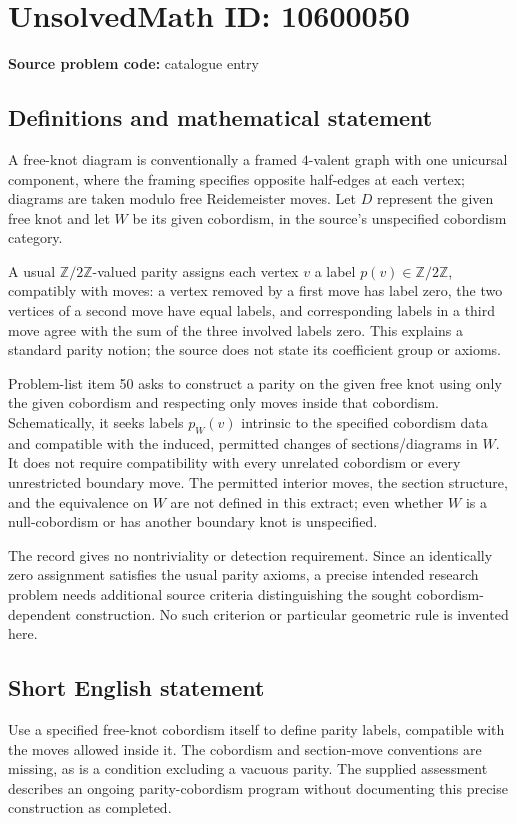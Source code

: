 \documentclass[11pt]{article}
\newcommand{\Z}{\mathbb{Z}}
\begin{document}
\section*{UnsolvedMath ID: 10600050}
\textbf{Source problem code:} catalogue entry
\subsection{Definitions and mathematical statement}
A free-knot diagram is conventionally a framed \(4\)-valent graph with one unicursal component, where the framing specifies opposite half-edges at each vertex; diagrams are taken modulo free Reidemeister moves. Let \(D\) represent the given free knot and let \(W\) be its given cobordism, in the source's unspecified cobordism category.

A usual \(\Z/2\Z\)-valued parity assigns each vertex \(v\) a label \(p(v)\in\Z/2\Z\), compatibly with moves: a vertex removed by a first move has label zero, the two vertices of a second move have equal labels, and corresponding labels in a third move agree with the sum of the three involved labels zero. This explains a standard parity notion; the source does not state its coefficient group or axioms.

Problem-list item 50 asks to construct a parity on the given free knot using only the given cobordism and respecting only moves inside that cobordism. Schematically, it seeks labels \(p_W(v)\) intrinsic to the specified cobordism data and compatible with the induced, permitted changes of sections/diagrams in \(W\). It does not require compatibility with every unrelated cobordism or every unrestricted boundary move. The permitted interior moves, the section structure, and the equivalence on \(W\) are not defined in this extract; even whether \(W\) is a null-cobordism or has another boundary knot is unspecified.

The record gives no nontriviality or detection requirement. Since an identically zero assignment satisfies the usual parity axioms, a precise intended research problem needs additional source criteria distinguishing the sought cobordism-dependent construction. No such criterion or particular geometric rule is invented here.
\subsection{Short English statement}
Use a specified free-knot cobordism itself to define parity labels, compatible with the moves allowed inside it. The cobordism and section-move conventions are missing, as is a condition excluding a vacuous parity. The supplied assessment describes an ongoing parity-cobordism program without documenting this precise construction as completed.
\end{document}
